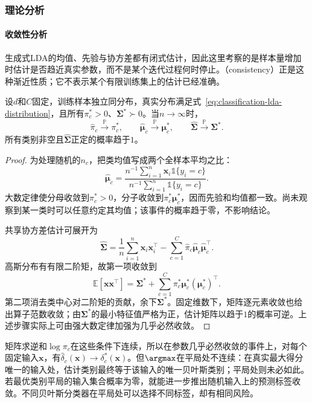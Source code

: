 \subsubsection{理论分析}
\label{sec:classification-lda-analysis}

\paragraph{收敛性分析}
生成式LDA的均值、先验与协方差都有闭式估计，因此这里考察的是样本量增加时估计是否趋近真实参数，而不是某个迭代过程何时停止。（consistency）正是这种渐近性质；它不表示某个有限训练集上的估计已经准确。

\begin{theorem}[LDA参数估计的一致性]
  \label{thm:classification-lda-consistency}
  设$d$和$C$固定，训练样本独立同分布，真实分布满足式~\eqref{eq:classification-lda-distribution}，且所有$\pi_c^\ast>0$、$\bm{\Sigma}^\ast\succ0$。当$n\to\infty$时，
  \[
    \hat\pi_c\xrightarrow{\mathbb{P}}\pi_c^\ast,\qquad
    \hat{\bm{\mu}}_c\xrightarrow{\mathbb{P}}\bm{\mu}_c^\ast,\qquad
    \hat{\bm{\Sigma}}\xrightarrow{\mathbb{P}}\bm{\Sigma}^\ast .
  \]
  所有类别非空且$\hat{\bm{\Sigma}}$正定的概率趋于$1$。
\end{theorem}

\begin{proof}
  为处理随机的$n_c$，把类均值写成两个全样本平均之比：
  \[
    \hat{\bm{\mu}}_c
      =\frac{n^{-1}\sum_{i=1}^{n}\bm{x}_i\mathbb{1}\{y_i=c\}}
        {n^{-1}\sum_{i=1}^{n}\mathbb{1}\{y_i=c\}} .
  \]
  大数定律使分母收敛到$\pi_c^\ast>0$，分子收敛到$\pi_c^\ast\bm{\mu}_c^\ast$，因而先验和均值都一致。尚未观察到某一类时可以任意约定其均值；该事件的概率趋于零，不影响结论。

  共享协方差估计可展开为
  \[
    \hat{\bm{\Sigma}}
      =\frac1n\sum_{i=1}^{n}\bm{x}_i\bm{x}_i^{\top}
        -\sum_{c=1}^{C}\hat\pi_c
          \hat{\bm{\mu}}_c\hat{\bm{\mu}}_c^{\top}.
  \]
  高斯分布有有限二阶矩，故第一项收敛到
  \[
    \mathbb{E}[\bm{x}\bm{x}^{\top}]
      =\bm{\Sigma}^\ast+
        \sum_{c=1}^{C}\pi_c^\ast
          \bm{\mu}_c^\ast(\bm{\mu}_c^\ast)^{\top}.
  \]
  第二项消去类中心对二阶矩的贡献，余下$\bm{\Sigma}^\ast$。固定维数下，矩阵逐元素收敛也给出算子范数收敛；由$\bm{\Sigma}^\ast$的最小特征值严格为正，估计矩阵以趋于$1$的概率可逆。上述步骤实际上可由强大数定律加强为几乎必然收敛。
\end{proof}

矩阵求逆和$\log\pi_c$在这些条件下连续，所以在参数几乎必然收敛的事件上，对每个固定输入$\bm{x}$，有$\hat\delta_c(\bm{x})\to\delta_c^\ast(\bm{x})$。但$\argmax$在平局处不连续：在真实最大得分唯一的输入处，估计类别最终等于该输入的唯一贝叶斯类别；平局处则未必如此。若最优类别平局的输入集合概率为零，就能进一步推出随机输入上的预测标签收敛。不同贝叶斯分类器在平局处可以选择不同标签，却有相同风险。

